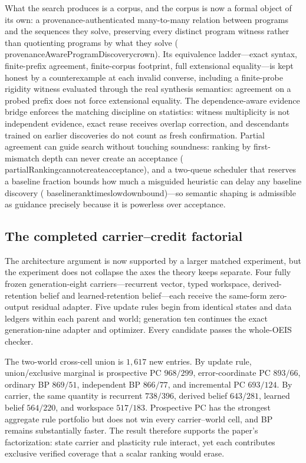 \documentclass[11pt]{article}
\newcommand{\leanname}[1]{{\scriptsize\ttfamily
  \def\_{\textunderscore\allowbreak}#1}}
\begin{document}
What the search produces is a corpus, and the corpus is now a formal object of its own:
a provenance-authenticated many-to-many relation between programs and the sequences they
solve, preserving every distinct program witness rather than quotienting programs by
what they solve (\leanname{provenanceAwareProgramDiscovery\_crown}). Its equivalence
ladder---exact syntax, finite-prefix agreement, finite-corpus footprint, full
extensional equality---is kept honest by a counterexample at each invalid converse,
including a finite-probe rigidity witness evaluated through the real synthesis
semantics: agreement on a probed prefix does not force extensional equality. The
dependence-aware evidence bridge enforces the matching discipline on statistics: witness
multiplicity is not independent evidence, exact reuse receives overlap correction, and
descendants trained on earlier discoveries do not count as fresh confirmation. Partial
agreement can guide search without touching soundness: ranking by first-mismatch depth
can never create an acceptance
(\leanname{partialRanking\_cannot\_create\_acceptance}), and a two-queue scheduler that
reserves a baseline fraction bounds how much a misguided heuristic can delay any
baseline discovery (\leanname{baseline\_rank\_time\_slowdown\_bound})---so semantic
shaping is admissible as guidance precisely because it is powerless over acceptance.

\subsection{The completed carrier--credit factorial}
\label{sec:carrier-credit-factorial}

The architecture argument is now supported by a larger matched experiment, but the
experiment does not collapse the axes the theory keeps separate. Four fully frozen
generation-eight carriers---recurrent vector, typed workspace, derived-retention belief
and learned-retention belief---each receive the same-form zero-output residual adapter.
Five update rules begin from identical states and data ledgers within each parent and
world; generation ten continues the exact generation-nine adapter and optimizer. Every
candidate passes the whole-OEIS checker.

The two-world cross-cell union is $1{,}617$ new entries. By update rule, union/exclusive
marginal is prospective PC $968/299$, error-coordinate PC $893/66$, ordinary BP
$869/51$, independent BP $866/77$, and incremental PC $693/124$. By carrier, the same
quantity is recurrent $738/396$, derived belief $643/281$, learned belief $564/220$,
and workspace $517/183$. Prospective PC has the strongest aggregate rule portfolio but
does not win every carrier--world cell, and BP remains substantially faster. The result
therefore supports the paper's factorization: state carrier and plasticity rule interact,
yet each contributes exclusive verified coverage that a scalar ranking would erase.
\end{document}
